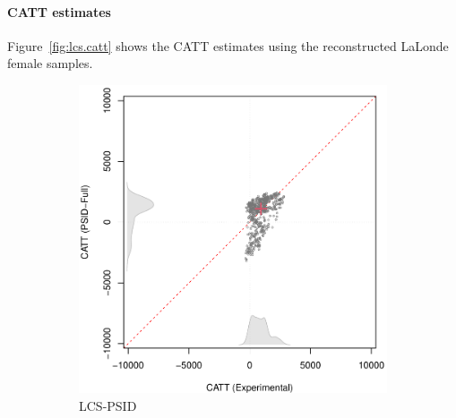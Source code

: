 \documentclass[letterpaper,12pt,leqno]{article}
\begin{document}
\clearpage


\paragraph{CATT estimates}  Figure~\ref{fig:lcs.catt} shows the CATT estimates using the reconstructed LaLonde female samples. 

\begin{figure}[!ht]
    \caption{CATT Estimates: Reconstructed Female Samples}\label{fig:lcs.catt}
    \centering\vspace{-0.5em}
    \begin{minipage}[c]{1\textwidth}
        \centering
        \begin{subfigure}{0.4\linewidth}
            \includegraphics[width=\linewidth]{catt_lcs_psid.pdf}
            \caption{LCS-PSID}
        \end{subfigure}
        \begin{subfigure}{0.4\linewidth}

\end{subfigure}
\end{minipage}
\end{figure}
\end{document}

